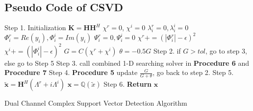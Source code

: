 \documentclass[12pt, draftclsnofoot, onecolumn]{IEEEtran}
\begin{document}
\begin{spacing}{2}
\section{Pseudo Code of CSVD}\label{Pseudo code of CSVD}
\begin{algorithm}[htb]
\begin{algorithmic}
\State Step 1. Initialization
\State $\mathbf{K}=\mathbf{H}\mathbf{H}^{H}$ 
\State $\chi^{r}=0$, $\chi^{i}=0$ 
\State $\lambda_{i}^{r}=0, \lambda_{i}^{i}=0$
\State $\Phi_{i}^{r}=Re(y_{i}), \Phi_{i}^{i}=Im(y_{i})$
\State $\Psi_{i}^{r}=0, \Psi_{i}^{i}=0$
\State $\chi^{r}+=(|\Phi^{r}_{i}|-\epsilon)^{2}$
\EndIf
{}
\State $\chi^{i}+=(|\Phi_{i}^{i}|-\epsilon)^{2}$
\EndIf
\EndFor 
\State $G=C(\chi^{r}+\chi^{i})$ 
\State $\theta=-0.5G$ 
\State  Step 2. if $G>tol$, go to step 3, else go to Step 5
\State Step 3.
\State call combined 1-D searching solver in \textbf{Procedure 6} and \textbf{Procedure 7}  
\State Step 4. \textbf{Procedure 5} update $\frac{G}{G+\theta}$, go back to step 2.
\State Step 5.
\State $\tilde{\mathbf{x}}=\mathbf{H}^{H}(\Lambda^{r}+i\Lambda^{i})$ 
\State $\mathbf{x}=\mathbb{Q}(\tilde{x})$
\State Step 6. \textbf{Return} $\mathbf{x}$ 
\EndProcedure
\end{algorithmic}
\label{CSVD algorithm}
\caption{Dual Channel Complex Support Vector Detection Algorithm }
\end{algorithm}










\end{spacing}
\end{document}
